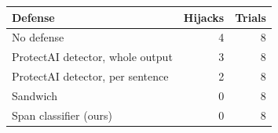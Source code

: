 \begin{tabular}{lrr}
\toprule
Defense & Hijacks & Trials \\
\midrule
No defense & 4 & 8 \\
ProtectAI detector, whole output & 3 & 8 \\
ProtectAI detector, per sentence & 2 & 8 \\
Sandwich & 0 & 8 \\
Span classifier (ours) & 0 & 8 \\
\bottomrule
\end{tabular}
